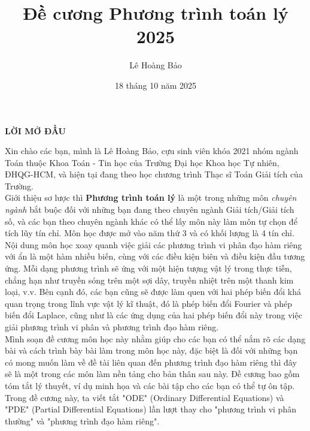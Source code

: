 \documentclass[10pt, a4paper]{article}
\title{\color{red}\textbf{Đề cương Phương trình toán lý 2025}}
\author{\color{red}Lê Hoàng Bảo}
\date{\color{red}18 tháng 10 năm 2025}
\begin{document}
	\pagestyle{fancy}
	\fancyhead{} %
	\fancyfoot{} %
	\fancyfoot[C]{\textbf\thepage}
	\renewcommand{\headrulewidth}{0.6pt}
	\renewcommand{\footrulewidth}{0.6pt}
	\renewcommand{\refname}{Tài liệu tham khảo}
	\maketitle\thispagestyle{empty}
	\newpage\thispagestyle{empty}
	\begin{center}
		\LARGE \textbf{LỜI MỞ ĐẦU}
	\end{center}
	
	Xin chào các bạn, mình là Lê Hoàng Bảo, cựu sinh viên khóa 2021 nhóm ngành Toán thuộc Khoa Toán - Tin học của Trường Đại học Khoa học Tự nhiên, ĐHQG-HCM, và hiện tại đang theo học chương trình Thạc sĩ Toán Giải tích của Trường.\\
	
	Giới thiệu sơ lược thì \textbf{Phương trình toán lý} là một trong những môn \textit{chuyên ngành} bắt buộc đối với những bạn đang theo chuyên ngành Giải tích/Giải tích số, và các bạn theo chuyên ngành khác có thể lấy môn này làm môn tự chọn để tích lũy tín chỉ. Môn học được mở vào năm thứ 3 và có khối lượng là 4 tín chỉ.\\
	
	Nội dung môn học xoay quanh việc giải các phương trình vi phân đạo hàm riêng với ẩn là một hàm nhiều biến, cùng với các điều kiện biên và điều kiện đầu tương ứng. Mỗi dạng phương trình sẽ ứng với một hiện tượng vật lý trong thực tiễn, chẳng hạn như truyền sóng trên một sợi dây, truyền nhiệt trên một thanh kim loại, v.v. Bên cạnh đó, các bạn cũng sẽ được làm quen với hai phép biến đổi khá quan trọng trong lĩnh vực vật lý kĩ thuật, đó là phép biến đổi Fourier và phép biến đổi Laplace, cũng như là các ứng dụng của hai phép biến đổi này trong việc giải phương trình vi phân và phương trình đạo hàm riêng.\\
	
	Mình soạn đề cương môn học này nhằm giúp cho các bạn có thể nắm rõ các dạng bài và cách trình bày bài làm trong môn học này, đặc biệt là đối với những bạn có mong muốn làm về đề tài liên quan đến phương trình đạo hàm riêng thì đây sẽ là một trong các môn làm nền tảng cho bản thân sau này. Đề cương bao gồm tóm tắt lý thuyết, ví dụ minh họa và các bài tập cho các bạn có thể tự ôn tập. Trong đề cương này, ta viết tắt "ODE" (Ordinary Differential Equations) và "PDE" (Partial Differential Equations) lần lượt thay cho "phương trình vi phân thường" và "phương trình đạo hàm riêng".\\
	
\end{document}
